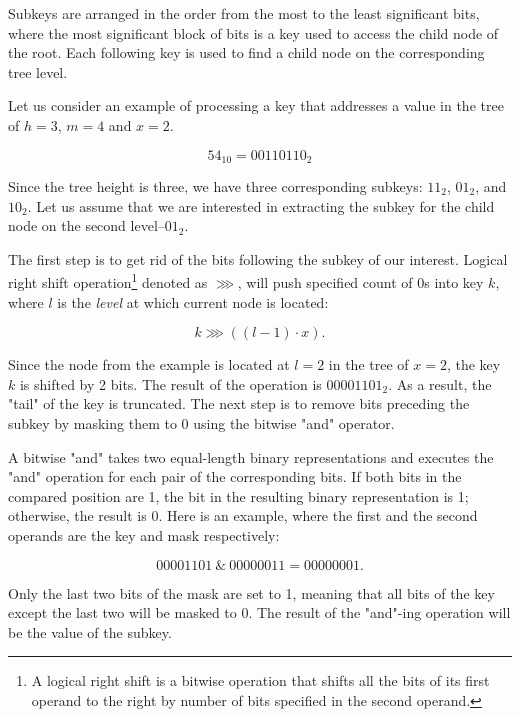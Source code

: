 Subkeys are arranged in the order from the most to the least significant bits, where the most significant block of bits is a key used to access the child node of the root. Each following key is used to find a child node on the corresponding tree level.

Let us consider an example of processing a key that addresses a value in the tree of $h = 3$, $m = 4$ and $x = 2$.

\begin{equation}
    54_{10} = 00110110_2
\end{equation}

Since the tree height is three, we have three corresponding subkeys: $11_2$, $01_2$, and $10_2$. Let us assume that we are interested in extracting the subkey for the child node on the second level--$01_2$.

The first step is to get rid of the bits following the subkey of our interest. Logical right shift operation\footnote{A logical right shift is a bitwise operation that shifts all the bits of its first operand to the right by number of bits specified in the second operand.} denoted as $\ggg$, will push specified count of 0s into key $k$, where $l$ is the \emph{level} at which current node is located:

\begin{equation}
    k \ggg ((l - 1) \cdot x).
\end{equation}

Since the node from the example is located at $l = 2$ in the tree of $x = 2$, the key $k$ is shifted by 2 bits. The result of the operation is $00001101_2$. As a result, the "tail" of the key is truncated. The next step is to remove bits preceding the subkey by masking them to 0 using the bitwise "and" operator.

A bitwise "and" takes two equal-length binary representations and executes the "and" operation for each pair of the corresponding bits. If both bits in the compared position are 1, the bit in the resulting binary representation is 1; otherwise, the result is 0. Here is an example, where the first and the second operands are the key and mask respectively:

\begin{equation}
    00001101 \ \& \ 00000011 = 00000001.
\end{equation}

Only the last two bits of the mask are set to 1, meaning that all bits of the key except the last two will be masked to 0. The result of the "and"-ing operation will be the value of the subkey.

